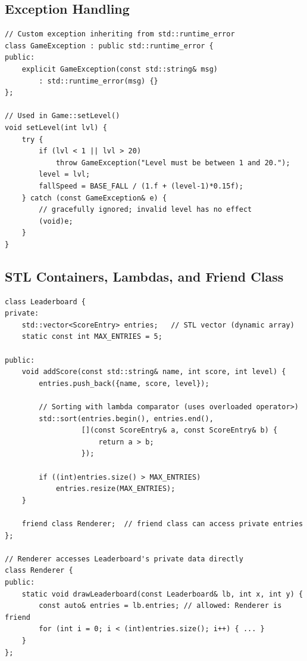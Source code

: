 \documentclass[11pt]{article}
\begin{document}
\subsection{Exception Handling}

\begin{lstlisting}[caption={Custom exception class and usage in setLevel()}]
// Custom exception inheriting from std::runtime_error
class GameException : public std::runtime_error {
public:
    explicit GameException(const std::string& msg)
        : std::runtime_error(msg) {}
};

// Used in Game::setLevel()
void setLevel(int lvl) {
    try {
        if (lvl < 1 || lvl > 20)
            throw GameException("Level must be between 1 and 20.");
        level = lvl;
        fallSpeed = BASE_FALL / (1.f + (level-1)*0.15f);
    } catch (const GameException& e) {
        // gracefully ignored; invalid level has no effect
        (void)e;
    }
}
\end{lstlisting}

\subsection{STL Containers, Lambdas, and Friend Class}

\begin{lstlisting}[caption={Leaderboard with STL vector, lambda sort, and friend Renderer}]
class Leaderboard {
private:
    std::vector<ScoreEntry> entries;   // STL vector (dynamic array)
    static const int MAX_ENTRIES = 5;

public:
    void addScore(const std::string& name, int score, int level) {
        entries.push_back({name, score, level});

        // Sorting with lambda comparator (uses overloaded operator>)
        std::sort(entries.begin(), entries.end(),
                  [](const ScoreEntry& a, const ScoreEntry& b) {
                      return a > b;
                  });

        if ((int)entries.size() > MAX_ENTRIES)
            entries.resize(MAX_ENTRIES);
    }

    friend class Renderer;  // friend class can access private entries
};

// Renderer accesses Leaderboard's private data directly
class Renderer {
public:
    static void drawLeaderboard(const Leaderboard& lb, int x, int y) {
        const auto& entries = lb.entries; // allowed: Renderer is friend
        for (int i = 0; i < (int)entries.size(); i++) { ... }
    }
};
\end{lstlisting}
\end{document}
